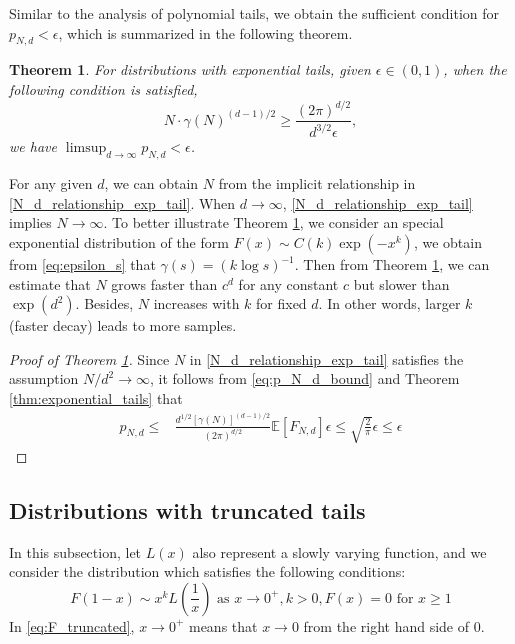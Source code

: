 \documentclass[conference,a4paper]{IEEEtran}
\def\E{\mathbb{E}}
\newtheorem{theorem}{Theorem}
\begin{document}
Similar to the analysis of polynomial tails, we obtain the
sufficient condition for $p_{N,d} < \epsilon$,
which is summarized in the following theorem.
\begin{theorem}\label{thm:exp_tails_sample}
  For distributions with exponential tails, given $\epsilon \in (0,1)$, when the following condition is satisfied,
  \begin{equation}\label{N_d_relationship_exp_tail}
    N\cdot \gamma(N)^{(d-1)/2} \geq \frac{(2\pi)^{d/2} }{d^{3/2} \epsilon},
  \end{equation}
  we have $ \limsup_{d\to\infty} p_{N,d} < \epsilon$.
\end{theorem}
For any given $d$, we can obtain $N$ from the implicit relationship in \eqref{N_d_relationship_exp_tail}.
When $d\to \infty$, \eqref{N_d_relationship_exp_tail} implies $N\to \infty$.
To better illustrate Theorem \ref{thm:exp_tails_sample},
we consider an special exponential distribution of the form $F(x) \sim C(k)\exp(-x^k)$, we obtain from \eqref{eq:epsilon_s}
that $\gamma(s)=(k\log s)^{-1}$.
Then from Theorem \ref{thm:exp_tails_sample},
we can estimate that
$N$ grows faster than $c^d$ for any constant $c$ but slower than $\exp(d^2)$.
Besides, $N$ increases with $k$ for fixed $d$.
In other words, larger $k$ (faster decay) leads to more samples.
\begin{proof}[Proof of Theorem \ref{thm:exp_tails_sample}]
     Since $N$ in \eqref{N_d_relationship_exp_tail} satisfies the assumption $N/d^2 \to \infty$,
     it follows from \eqref{eq:p_N_d_bound} and Theorem \ref{thm:exponential_tails} that
     \begin{align*}
     p_{N,d} \leq &\frac{d^{1/2}[\gamma(N)]^{(d-1)/2}}{(2\pi)^{d/2}}
     \E[F_{N,d}]\epsilon
     \leq \sqrt{\frac{2}{\pi}}\epsilon \leq \epsilon
     \end{align*}
\end{proof}
\subsection{Distributions with truncated tails}
In this subsection, let $L(x)$ also represent a slowly varying function, and we consider the distribution which satisfies
the following conditions:
\begin{equation}\label{eq:F_truncated}
     F(1-x) \sim x^k L\left(\frac{1}{x} \right)  \text{ as } x \to 0^+, k> 0,
     F(x) = 0 \text{ for } x \geq 1
\end{equation}
In \eqref{eq:F_truncated}, $x \to 0^+$ means that $x\to 0$ from the right hand side of $0$.
\end{document}
